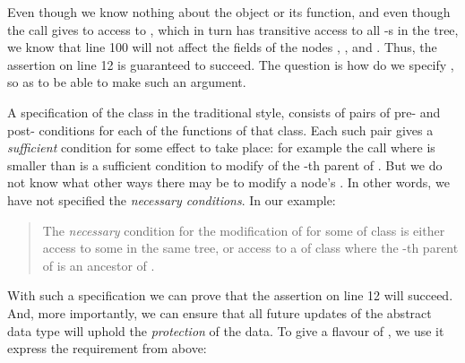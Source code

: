 Even though we know nothing about the  object or its  function, and even though the call gives to   access to , which in turn has transitive access to all  -s in the tree, 
we know that %
line 100 will not affect the    fields of the nodes , , and . 
Thus, the assertion on line 12 is guaranteed to succeed. 
The question is how do we specify , so as to be able to make such an argument. %

A  specification of the class  
in the traditional   style, \eg  \cite{Leavens-etal07} %
consists of pairs of pre- and post- conditions for each of the
functions of that class. Each such pair gives a {\em sufficient}
condition for some effect to take place: for example the
call  where  is smaller
than  is a sufficient condition to
modify    of the -th parent of . But
we do not know what other ways there may be  to modify a
node's  . In other words, we have not specified
the \emph{necessary conditions}.
%
%
%
In our example:

\begin{quote}
The \emph{necessary} condition for the modification of  for some  of class   is either access to some    in the same tree, or  access to a  of class  where the -th parent of  is an ancestor of .
\end{quote}


With such a specification we can prove that the assertion on line 12 will succeed. And, more importantly, we can ensure that all future updates of the  abstract data type will uphold the \emph{protection} of the  data.
%
%
To give a flavour of \Chainmail, we use it  express the requirement from above:
\vspace{.1cm}

